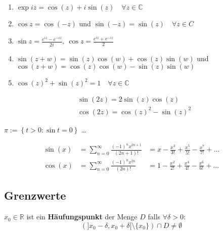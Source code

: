 \documentclass[8pt,a4paper,twocolumn,table]{extarticle}
\newcommand{\R}{\mathbb{R}}
\newcommand{\C}{\mathbb{C}}
\begin{document}
\begin{satz}{3.42}
    \begin{enumerate}
        \item $\exp iz = \cos(z) + i \sin(z)\quad \forall z \in \C$
        \item $\cos z = \cos(-z)$ und $\sin(-z) = \sin(z)\quad \forall z \in C$
        \item $\sin z = \frac{e^{iz} - e^{-iz}}{2i},\ \cos z = \frac{e^{iz} + e^{-iz}}{2}$
        \item $\sin(z + w) = \sin(z)\cos(w) + \cos(z)\sin(w)$ und $\cos(z + w) = \cos(z)\cos(w) - \sin(z)\sin(w)$
        \item $\cos(z)^2 + \sin(z)^2 = 1\quad \forall z \in \C$
    \end{enumerate}
\end{satz}

\begin{korollar}{3.43}
    \begin{align*}
         & \sin(2z) = 2\sin(z)\cos(z)       \\
         & \cos(2z) = \cos(z)^2 - \sin(z)^2
    \end{align*}
\end{korollar}

\begin{satz}{3.44}
    $\pi := \left\{ t > 0 : \sin t = 0 \right\}$ \dots
\end{satz}

\begin{satz}{}
    \begin{alignat*}{2}
        \sin(x) & = \sum_{n = 0}^\infty \frac{(-1)^n x^{2n + 1}}{(2n + 1)!} & = x - \frac{x^3}{3!} + \frac{x^5}{5!} - \frac{x^7}{7!} + ... \\
        \cos(x) & = \sum_{n = 0}^\infty \frac{(-1)^n x^{2n}}{(2n)!}         & = 1 - \frac{x^2}{2!} + \frac{x^4}{4!} - \frac{x^6}{6!} + ...
    \end{alignat*}
\end{satz}

\subsection{Grenzwerte}

\begin{definition}{3.47}
    $x_0 \in \R$ ist ein \textbf{Häufungspunkt} der Menge $D$ falls $\forall \delta > 0$:
    \[ (]x_0 - \delta, x_0 + \delta[ \setminus \{x_0\}) \cap D \ne \emptyset \]
\end{definition}
\end{document}

